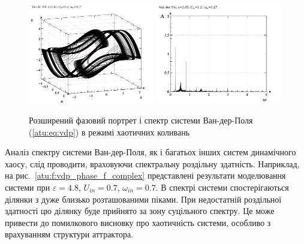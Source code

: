 \begin{figure}[ht!]
\begin{center}
  \includegraphics[width=0.49\textwidth]{p/cha/vdp/vdp_0-p_ph2d_2x65_1x20_0x27.png}
  \hfill
  \includegraphics[width=0.49\textwidth]{p/cha/vdp/vdp_fft-p_f_2x65_1x20_0x27.png}
\end{center}
\caption{Розширений фазовий портрет і спектр системи Ван-дер-Поля (\ref{atu:eq:vdp}) в режимі хаотичних коливань}
\label{atu:f:vdp_phase_f_chaos}
\end{figure}

Аналіз спектру системи Ван-дер-Поля, як і багатьох інших систем
динамічного хаосу, слід проводити, враховуючи спектральну
роздільну здатність. Наприклад, на рис.~\ref{atu:f:vdp_phase_f_complex} представлені
результати моделювання системи при
$ \varepsilon = 4.8 $,
$ U_{in} = 0.7 $,
$ \omega_{in} = 0.7 $. В спектрі системи спостерігаються ділянки з дуже
близько розташованими піками. При недостатній роздільної
здатності цю ділянку буде прийнято за зону суцільного
спектру. Це може привести до помилкового висновку про хаотичність системи,
особливо з врахуванням структури аттрактора.

